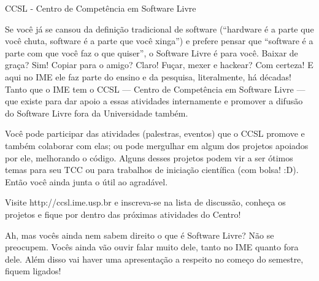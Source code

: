 \begin{secao}{CCSL - Centro de Competência em Software Livre}

Se você já se cansou da definição tradicional de software (``hardware é a parte
que você chuta, software é a parte que você xinga'') e prefere pensar que
``software é a parte com que você faz o que quiser'', o Software Livre é para
você. Baixar de graça? Sim! Copiar para o amigo? Claro! Fuçar, mexer e hackear?
Com certeza! E aqui no IME ele faz parte do ensino e da pesquisa, literalmente,
há décadas! Tanto que o IME tem o CCSL --- Centro de Competência em Software
Livre --- que existe para dar apoio a essas atividades internamente e promover a
difusão do Software Livre fora da Universidade também.

Você pode participar das atividades (palestras, eventos) que o CCSL
promove e também colaborar com elas; ou pode mergulhar em algum dos
projetos apoiados por ele, melhorando o código. Alguns desses projetos
podem vir a ser ótimos temas para seu TCC ou para trabalhos de
iniciação científica (com bolsa! :D). Então você ainda junta o útil ao
agradável.

Visite http://ccsl.ime.usp.br e inscreva-se na lista de discussão,
conheça os projetos e fique por dentro das próximas atividades do
Centro!

Ah, mas vocês ainda nem sabem direito o que é Software Livre? Não se preocupem.
Vocês ainda vão ouvir falar muito dele, tanto no IME quanto fora dele. Além
disso vai haver uma apresentação a respeito no começo do semestre, fiquem
ligados! %

\end{secao}
